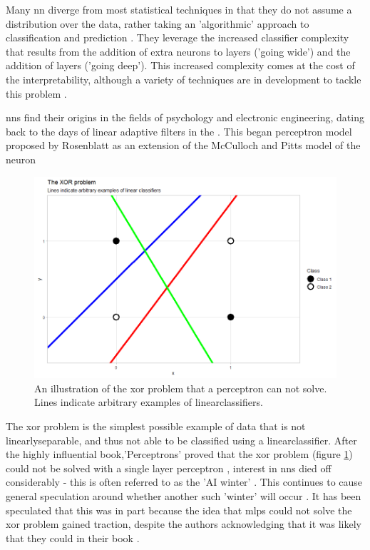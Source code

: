 Many \gls{nn} diverge from most statistical techniques in that they do not assume a distribution over the data, rather taking an 'algorithmic' approach to classification and prediction \cite{two_cultures}. They leverage the increased classifier complexity that results from the addition of extra neurons to layers ('going wide') and the addition of \gls{layer}s ('going deep'). This increased complexity comes at the cost of the interpretability, although a variety of techniques are in development to tackle this problem \cite{nn_interpretability}.

\gls{nn}s find their origins in the fields of psychology and electronic engineering, dating back to the days of linear adaptive filters in the \cite{nns_haykins}. This began perceptron model proposed by Rosenblatt \cite{perceptron_paper} as an extension of the McCulloch and Pitts model of the neuron \cite{logical_calculus} \bigskip

\begin{figure}
    \centering
    \includegraphics[width=120mm]{figs/xor_problem.png}
    \caption{An illustration of the \gls{xor} problem that a perceptron can not solve. Lines indicate arbitrary examples of \gls{linearclassifier}s.}
    \label{fig:xor_problem}
\end{figure}

The \gls{xor} problem is the simplest possible example of data that is not \gls{linearlyseparable}, and thus not able to be classified using a \gls{linearclassifier}. After the highly influential book,'Perceptrons' proved that the \gls{xor} problem (figure \ref{fig:xor_problem}) could not be solved with a single layer perceptron \cite{perceptrons_book}, interest in \gls{nn}s died off considerably - this is often referred to as the 'AI winter' \cite{ai_winter}. This continues to cause general speculation around whether another such 'winter' will occur \cite{ai_winter_spec}. It has been speculated \cite{perceptron_spec} that this was in part because the idea that \gls{mlp}s could not solve the \gls{xor} problem gained traction, despite the authors acknowledging that it was likely that they could in their book \cite{perceptron_book}. \bigskip

